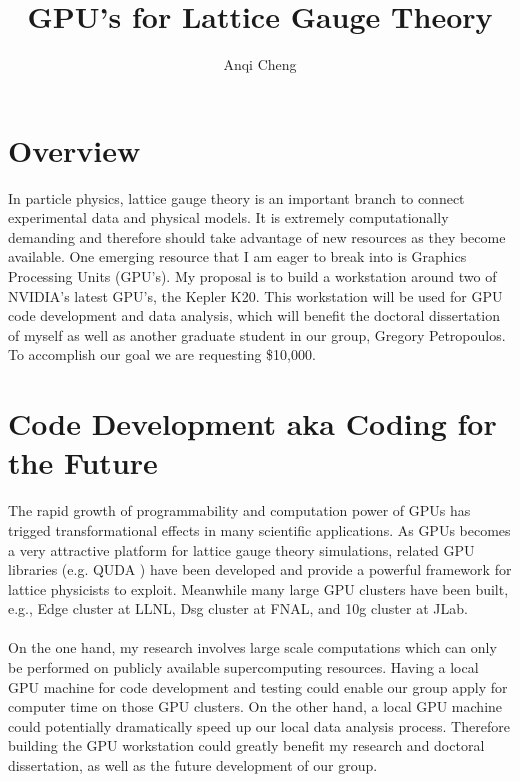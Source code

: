 \documentclass[11pt]{article}
\begin{document}
  \title{GPU's for Lattice Gauge Theory}
  \author{Anqi Cheng}
  \maketitle

  \section*{Overview} %
  In particle physics, lattice gauge theory is an important branch to connect experimental data and physical models.
  It is extremely computationally demanding and therefore should take advantage of new  resources as they become available.
  One emerging resource that I am eager to break into is Graphics Processing Units (GPU's).   
  My proposal is to build a workstation around two of NVIDIA's latest GPU's, the Kepler K20.  
  This workstation will be used for GPU code development and data analysis, which will benefit the doctoral dissertation of myself as well as another 
  graduate student in our group, Gregory Petropoulos. To accomplish our goal we are requesting \$10,000.  
  
   \section*{Code Development aka Coding for the Future} %
 The rapid growth of programmability and computation power of GPUs has trigged transformational effects in many scientific applications. As GPUs becomes 
 a very attractive platform for lattice gauge theory simulations, related GPU libraries (e.g. QUDA \cite{QUDA1,QUDA2,QUDA3}) have been developed and  
 provide a powerful framework for lattice physicists to exploit. Meanwhile many large GPU clusters have been built, e.g., Edge cluster at LLNL,
 Dsg cluster at FNAL, and 10g cluster at JLab.\\\\
 On the one hand, my research involves large scale computations which can only be performed on publicly available supercomputing resources. Having a 
 local GPU machine for code development and testing could enable our group apply for computer time on those GPU clusters. On the other hand, a local 
 GPU machine could potentially dramatically speed up our local data analysis process. Therefore building the GPU workstation could greatly benefit my 
 research and doctoral dissertation, as well as the future development of our group.
 
\end{document}
